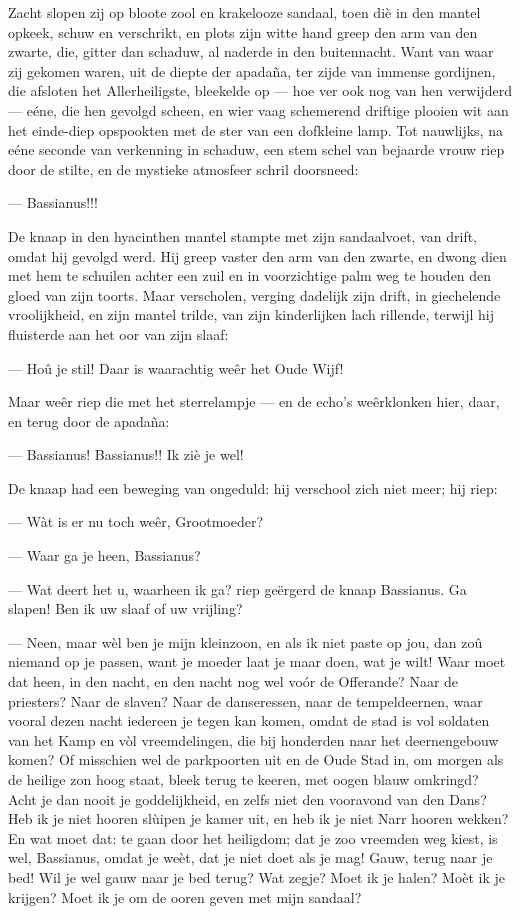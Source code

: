 \documentclass[a4paper, 12pt, oneside, dutch]{article}
\begin{document}
Zacht slopen zij op bloote zool en krakelooze sandaal, toen diè in den mantel opkeek, schuw en verschrikt, en plots zijn witte hand greep den arm van den zwarte, die, gitter dan schaduw, al naderde in den buitennacht. Want van waar zij gekomen waren, uit de diepte der apadaña, ter zijde van immense gordijnen, die afsloten het Allerheiligste, bleekelde op --- hoe ver ook nog van hen verwijderd --- eéne, die hen gevolgd scheen, en wier vaag schemerend driftige plooien wit aan het einde-diep opspookten met de ster van een dofkleine lamp. Tot nauwlijks, na eéne seconde van verkenning in schaduw, een stem schel van bejaarde vrouw riep door de stilte, en de mystieke atmosfeer schril doorsneed:

--- Bassianus!!!

De knaap in den hyacinthen mantel stampte met zijn sandaalvoet, van drift, omdat hij gevolgd werd. Hij greep vaster den arm van den zwarte, en dwong dien met hem te schuilen achter een zuil en in voorzichtige palm weg te houden den gloed van zijn toorts. Maar verscholen, verging dadelijk zijn drift, in giechelende vroolijkheid, en zijn mantel trilde, van zijn kinderlijken lach rillende, terwijl hij fluisterde aan het oor van zijn slaaf:

--- Hoû je stil! Daar is waarachtig weêr het Oude Wijf!

Maar weêr riep die met het sterrelampje --- en de echo's weêrklonken hier, daar, en terug door de apadaña:

--- Bassianus! Bassianus!! Ik ziè je wel!

De knaap had een beweging van ongeduld: hij verschool zich niet meer; hij riep:

--- Wàt is er nu toch weêr, Grootmoeder?

--- Waar ga je heen, Bassianus?

--- Wat deert het u, waarheen ik ga? riep geërgerd de knaap Bassianus. Ga slapen! Ben ik uw slaaf of uw vrijling?

--- Neen, maar wèl ben je mijn kleinzoon, en als ik niet paste op jou, dan zoû niemand op je passen, want je moeder laat je maar doen, wat je wilt! Waar moet dat heen, in den nacht, en den nacht nog wel voór de Offerande? Naar de priesters? Naar de slaven? Naar de danseressen, naar de tempeldeernen, waar vooral dezen nacht iedereen je tegen kan komen, omdat de stad is vol soldaten van het Kamp en vòl vreemdelingen, die bij honderden naar het deernengebouw komen? Of misschien wel de parkpoorten uit en de Oude Stad in, om morgen als de heilige zon hoog staat, bleek terug te keeren, met oogen blauw omkringd? Acht je dan nooit je goddelijkheid, en zelfs niet den vooravond van den Dans? Heb ik je niet hooren slùipen je kamer uit, en heb ik je niet Narr hooren wekken? En wat moet dat: te gaan door het heiligdom; dat je zoo vreemden weg kiest, is wel, Bassianus, omdat je weèt, dat je niet doet als je mag! Gauw, terug naar je bed! Wil je wel gauw naar je bed terug? Wat zegje? Moet ik je halen? Moèt ik je krijgen? Moet ik je om de ooren geven met mijn sandaal?
\end{document}

